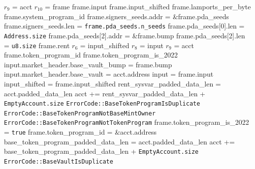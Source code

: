 \begin{algorithm}
\caption{INIT-BASE-VAULT}
\begin{algorithmic}
  \INPUT $r_9$ = acct
  \INPUT $r_{10}$ = frame
  \REQUIRE frame.input
  \REQUIRE frame.input\_shifted
  \REQUIRE frame.lamports\_per\_byte
  \REQUIRE frame.system\_program\_id
  \REQUIRE frame.signers\_seeds.addr = \&frame.pda\_seeds
  \REQUIRE frame.signers\_seeds.len = \texttt{frame.pda\_seeds.n\_seeds}
  \REQUIRE frame.pda\_seeds[0].len = \texttt{Address.size}
  \REQUIRE frame.pda\_seeds[2].addr = \&frame.bump
  \REQUIRE frame.pda\_seeds[2].len = \texttt{u8.size}
  \REQUIRE frame.rent
  \ENSURE $r_6$ = input\_shifted
  \ENSURE $r_8$ = input
  \ENSURE $r_9$ = acct
  \ENSURE frame.token\_program\_id
  \ENSURE frame.token\_program\_is\_2022
  \ENSURE input.market\_header.base\_vault\_bump = frame.bump
  \ENSURE input.market\_header.base\_vault = acct.address
  \STATE input = frame.input
  \STATE input\_shifted = frame.input\_shifted
  \STATE rent\_sysvar\_padded\_data\_len = acct.padded\_data\_len
  \STATE acct += rent\_sysvar\_padded\_data\_len + \texttt{EmptyAccount.size}
    \RETURN \texttt{ErrorCode::BaseTokenProgramIsDuplicate}
  \ENDIF
    \RETURN \texttt{ErrorCode::BaseTokenProgramNotBaseMintOwner}
  \ENDIF
      \RETURN \texttt{ErrorCode::BaseTokenProgramNotTokenProgram}
    \ENDIF
    \STATE frame.token\_program\_is\_2022 = \texttt{true}
  \ENDIF
  \STATE frame.token\_program\_id = \&acct.address
  \STATE base\_token\_program\_padded\_data\_len = acct.padded\_data\_len
  \STATE acct += base\_token\_program\_padded\_data\_len + \texttt{EmptyAccount.size}
    \RETURN \texttt{ErrorCode::BaseVaultIsDuplicate}

\end{algorithmic}
\end{algorithm}
